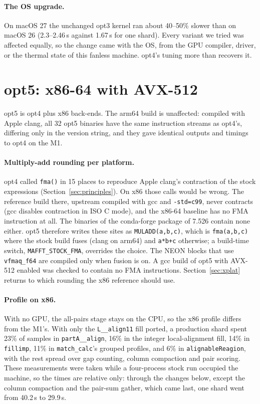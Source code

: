 \documentclass[11pt]{article}
\newcommand{\code}[1]{\texttt{#1}}
\begin{document}
\paragraph{The OS upgrade.} On macOS 27 the unchanged opt3 kernel ran about 40--50\% slower
than on macOS 26 (2.3--2.46\,s against 1.67\,s for one shard). Every variant we tried was
affected equally, so the change came with the OS, from the GPU compiler, driver, or the
thermal state of this fanless machine. opt4's tuning more than recovers it.
\label{sec:os}

\section{opt5: x86-64 with AVX-512}
\label{sec:opt5}

opt5 is opt4 plus x86 back-ends. The arm64 build is unaffected: compiled with Apple clang,
all 32 opt5 binaries have the same instruction streams as opt4's, differing only in the
version string, and they gave identical outputs and timings to opt4 on the M1.

\paragraph{Multiply-add rounding per platform.} opt4 called \code{fma()} in 15 places to
reproduce Apple clang's contraction of the stock expressions (Section~\ref{sec:principles}).
On x86 those calls would be wrong. The reference build there, upstream compiled with gcc and
\code{-std=c99}, never contracts (gcc disables contraction in ISO C mode), and the x86-64
baseline has no FMA instruction at all. The binaries of the conda-forge package of 7.526
contain none either. opt5 therefore writes these sites as
\code{MULADD(a,b,c)}, which is \code{fma(a,b,c)} where the stock build fuses (clang on arm64)
and \code{a*b+c} otherwise; a build-time switch, \code{MAFFT\_STOCK\_FMA}, overrides the
choice. The NEON blocks that use \code{vfmaq\_f64} are compiled only when fusion is on. A
gcc build of opt5 with AVX-512 enabled was checked to contain no FMA instructions.
Section~\ref{sec:xplat} returns to which rounding the x86 reference should use.

\paragraph{Profile on x86.} With no GPU, the all-pairs stage stays on the CPU, so the x86
profile differs from the M1's. With only the \code{L\_\_align11} fill ported, a production
shard spent 23\% of samples in \code{partA\_\_align}, 16\% in the integer local-alignment
fill, 14\% in \code{fillimp}, 11\% in \code{match\_calc}'s grouped profiles, and 6\% in
\code{alignableReagion}, with the rest spread over gap counting, column compaction and pair
scoring. These measurements were taken while a four-process stock run occupied the machine,
so the times are relative only: through the changes below, except the column compaction
and the pair-sum gather, which came last, one shard went from 40.2\,s to 29.9\,s.
\end{document}
